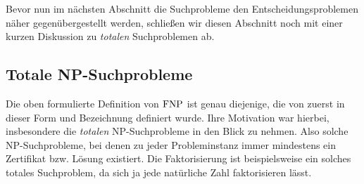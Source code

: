 Bevor nun im nächsten Abschnitt die Suchprobleme den Entscheidungsproblemen näher gegenübergestellt werden, schließen wir diesen Abschnitt noch mit einer kurzen Diskussion zu \emph{totalen} Suchproblemen ab.

\subsection*{Totale NP-Suchprobleme}

Die oben formulierte Definition von $\mathrm{FNP}$ ist genau diejenige, die von \textcite{megiddo_total_1991} zuerst in dieser Form und Bezeichnung definiert wurde. Ihre Motivation war hierbei, insbesondere die \emph{totalen} NP-Suchprobleme in den Blick zu nehmen. Also solche NP-Suchprobleme, bei denen zu jeder Probleminstanz immer mindestens ein Zertifikat bzw. Lösung existiert. Die Faktorisierung ist beispielsweise ein solches totales Suchproblem, da sich ja jede natürliche Zahl faktorisieren lässt.

